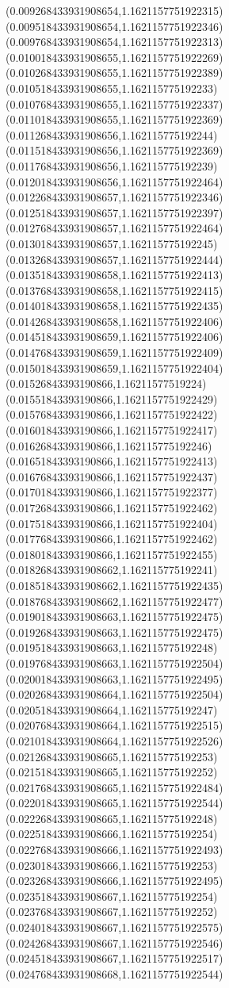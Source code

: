 {(0.009268433931908654,1.1621157751922315)
(0.009518433931908654,1.1621157751922346)
(0.009768433931908654,1.1621157751922313)
(0.010018433931908655,1.1621157751922269)
(0.010268433931908655,1.1621157751922389)
(0.010518433931908655,1.162115775192233)
(0.010768433931908655,1.1621157751922337)
(0.011018433931908655,1.1621157751922369)
(0.011268433931908656,1.162115775192244)
(0.011518433931908656,1.1621157751922369)
(0.011768433931908656,1.162115775192239)
(0.012018433931908656,1.1621157751922464)
(0.012268433931908657,1.1621157751922346)
(0.012518433931908657,1.1621157751922397)
(0.012768433931908657,1.1621157751922464)
(0.013018433931908657,1.162115775192245)
(0.013268433931908657,1.1621157751922444)
(0.013518433931908658,1.1621157751922413)
(0.013768433931908658,1.1621157751922415)
(0.014018433931908658,1.1621157751922435)
(0.014268433931908658,1.1621157751922406)
(0.014518433931908659,1.1621157751922406)
(0.014768433931908659,1.1621157751922409)
(0.015018433931908659,1.1621157751922404)
(0.01526843393190866,1.16211577519224)
(0.01551843393190866,1.1621157751922429)
(0.01576843393190866,1.1621157751922422)
(0.01601843393190866,1.1621157751922417)
(0.01626843393190866,1.162115775192246)
(0.01651843393190866,1.1621157751922413)
(0.01676843393190866,1.1621157751922437)
(0.01701843393190866,1.1621157751922377)
(0.01726843393190866,1.1621157751922462)
(0.01751843393190866,1.1621157751922404)
(0.01776843393190866,1.1621157751922462)
(0.01801843393190866,1.1621157751922455)
(0.018268433931908662,1.162115775192241)
(0.018518433931908662,1.1621157751922435)
(0.018768433931908662,1.1621157751922477)
(0.019018433931908663,1.1621157751922475)
(0.019268433931908663,1.1621157751922475)
(0.019518433931908663,1.162115775192248)
(0.019768433931908663,1.1621157751922504)
(0.020018433931908663,1.1621157751922495)
(0.020268433931908664,1.1621157751922504)
(0.020518433931908664,1.162115775192247)
(0.020768433931908664,1.1621157751922515)
(0.021018433931908664,1.1621157751922526)
(0.021268433931908665,1.162115775192253)
(0.021518433931908665,1.162115775192252)
(0.021768433931908665,1.1621157751922484)
(0.022018433931908665,1.1621157751922544)
(0.022268433931908665,1.162115775192248)
(0.022518433931908666,1.162115775192254)
(0.022768433931908666,1.1621157751922493)
(0.023018433931908666,1.162115775192253)
(0.023268433931908666,1.1621157751922495)
(0.023518433931908667,1.162115775192254)
(0.023768433931908667,1.162115775192252)
(0.024018433931908667,1.1621157751922575)
(0.024268433931908667,1.1621157751922546)
(0.024518433931908667,1.1621157751922517)
(0.024768433931908668,1.1621157751922544)
}

